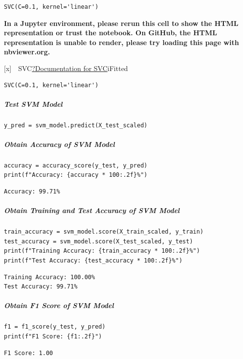 \begin{verbatim}
SVC(C=0.1, kernel='linear')
\end{verbatim}

\textbf{In a Jupyter environment, please rerun this cell to show the HTML representation or trust the notebook. \newline
On GitHub, the HTML representation is unable to render, please try loading this page with nbviewer.org.}

[x]~~SVC\href{https://scikit-learn.org/1.5/modules/generated/sklearn.svm.SVC.html}{?Documentation for SVC}iFitted\begin{verbatim}
SVC(C=0.1, kernel='linear')
\end{verbatim}

\subparagraph{Test SVM Model}

\begin{verbatim}
y_pred = svm_model.predict(X_test_scaled)
\end{verbatim}

\subparagraph{Obtain Accuracy of SVM Model}

\begin{verbatim}
accuracy = accuracy_score(y_test, y_pred)
print(f"Accuracy: {accuracy * 100:.2f}%")
\end{verbatim}

\begin{verbatim}
Accuracy: 99.71%
\end{verbatim}

\subparagraph{Obtain Training and Test Accuracy of SVM Model}

\begin{verbatim}
train_accuracy = svm_model.score(X_train_scaled, y_train)
test_accuracy = svm_model.score(X_test_scaled, y_test)
print(f"Training Accuracy: {train_accuracy * 100:.2f}%")
print(f"Test Accuracy: {test_accuracy * 100:.2f}%")
\end{verbatim}

\begin{verbatim}
Training Accuracy: 100.00%
Test Accuracy: 99.71%
\end{verbatim}

\subparagraph{Obtain F1 Score of SVM Model}

\begin{verbatim}
f1 = f1_score(y_test, y_pred)
print(f"F1 Score: {f1:.2f}")
\end{verbatim}

\begin{verbatim}
F1 Score: 1.00
\end{verbatim}

